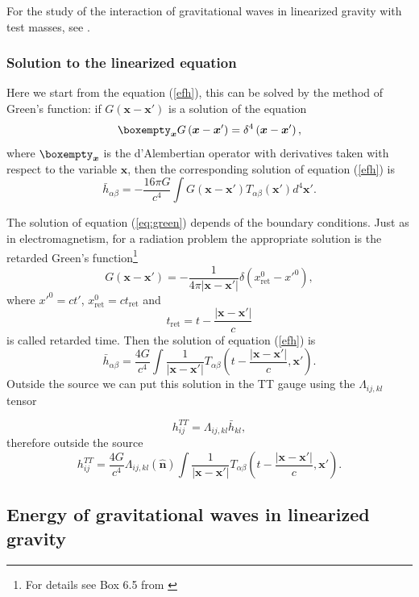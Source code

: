 For the study of the interaction of gravitational waves in linearized
gravity with test masses, see \cite{MAGGIORE}.

\subsubsection{Solution to the linearized equation}

Here we start from the equation (\ref{efh}), this can be solved by
the method of Green's function: if $G(\boldsymbol{x}-\boldsymbol{x}')$
is a solution of the equation
\begin{equation}
\boxempty_{\boldsymbol{x}}G\left(\boldsymbol{x}-\boldsymbol{x}'\right)=\delta^{4}\left(\boldsymbol{x}-\boldsymbol{x}'\right),\label{eq:green}
\end{equation}
where $\boxempty_{\boldsymbol{x}}$ is the d'Alembertian operator
with derivatives taken with respect to the variable $\boldsymbol{x}$,
then the corresponding solution of equation (\ref{efh}) is 
\[
\bar{h}_{\alpha\beta}=-\frac{16\pi G}{c^{4}}\int G\left(\boldsymbol{x}-\boldsymbol{x}'\right)T_{\alpha\beta}\left(\boldsymbol{x}'\right)d^{4}\boldsymbol{x}'.
\]

The solution of equation (\ref{eq:green}) depends of the boundary
conditions. Just as in electromagnetism, for a radiation problem the
appropriate solution is the retarded Green's function\footnote{For details see Box 6.5 from \cite{POISSON}}
\[
G\left(\boldsymbol{x}-\boldsymbol{x}'\right)=-\frac{1}{4\pi\left|\boldsymbol{x}-\boldsymbol{x}'\right|}\delta\left(x_{\text{ret}}^{0}-{x'}^{0}\right),
\]
where ${x'}^{0}=ct'$, $x_{\text{ret}}^{0}=ct_{\text{ret}}$ and 
\[
t_{\text{ret}}=t-\frac{\left|\boldsymbol{x}-\boldsymbol{x}'\right|}{c}
\]
is called retarded time. Then the solution of equation (\ref{efh})
is
\[
\bar{h}_{\alpha\beta}=\frac{4G}{c^{4}}\int\frac{1}{\left|\boldsymbol{x}-\boldsymbol{x}'\right|}T_{\alpha\beta}\left(t-\frac{\left|\boldsymbol{x}-\boldsymbol{x}'\right|}{c},\boldsymbol{x}'\right).
\]
Outside the source we can put this solution in the TT gauge using
the $\Lambda_{ij,kl}$ tensor

\[
h_{ij}^{TT}=\Lambda_{ij,kl}\bar{h}_{kl},
\]
therefore outside the source
\[
h_{ij}^{TT}=\frac{4G}{c^{4}}\Lambda_{ij,kl}\left(\hat{\boldsymbol{n}}\right)\int\frac{1}{\left|\boldsymbol{x}-\boldsymbol{x}'\right|}T_{\alpha\beta}\left(t-\frac{\left|\boldsymbol{x}-\boldsymbol{x}'\right|}{c},\boldsymbol{x}'\right).
\]

\subsection{Energy of gravitational waves in linearized gravity}

